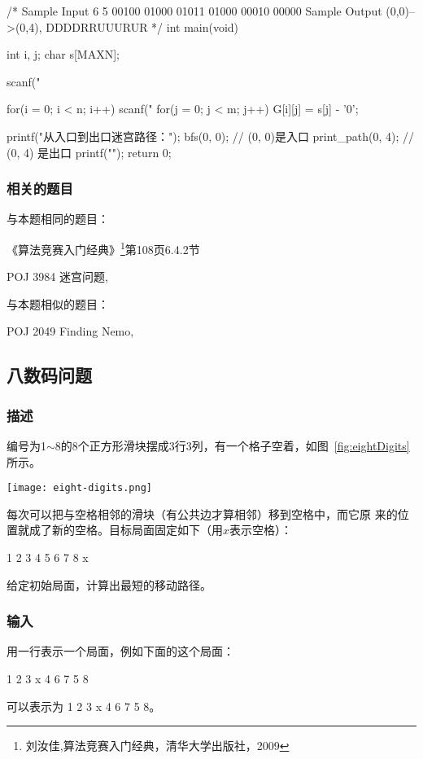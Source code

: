 \begin{Codex}[label=maze.c]
/*
Sample Input
6 5
00100
01000
01011
01000
00010
00000
Sample Output
(0,0)-->(0,4), DDDDRRUUURUR
*/
int main(void) {
    int i, j;
    char s[MAXN];

    scanf("%

    for(i = 0; i < n; i++) {
        scanf("%
        for(j = 0; j < m; j++) {
            G[i][j] = s[j] - '0';
        }
    }

    printf("从入口到出口迷宫路径：\n");
    bfs(0, 0);	// (0, 0)是入口
    print_path(0, 4); // (0, 4) 是出口
    printf("\n");
    return 0;
}
\end{Codex}

\subsubsection{相关的题目}
与本题相同的题目：
\begindot
\item 《算法竞赛入门经典》\footnote{刘汝佳,算法竞赛入门经典，清华大学出版社，2009}第108页6.4.2节
\item  POJ 3984 迷宫问题, 
\myenddot

与本题相似的题目：
\begindot
\item  POJ 2049 Finding Nemo, 
\myenddot

\subsection{八数码问题}
\label{subsec:eightDigits}

\subsubsection{描述}
编号为1$\sim$8的8个正方形滑块摆成3行3列，有一个格子空着，如图~\ref{fig:eightDigits}所示。

\begin{center}
\texttt{[image: eight-digits.png]}\\
\label{fig:eightDigits}
\end{center}

每次可以把与空格相邻的滑块（有公共边才算相邻）移到空格中，而它原
来的位置就成了新的空格。目标局面固定如下（用$x$表示空格）：
\begin{Code}
1 2 3
4 5 6
7 8 x
\end{Code}

给定初始局面，计算出最短的移动路径。

\subsubsection{输入}
用一行表示一个局面，例如下面的这个局面：
\begin{Code}
 1  2  3
 x  4  6
 7  5  8
\end{Code}
可以表示为 1 2 3 x 4 6 7 5 8。 

